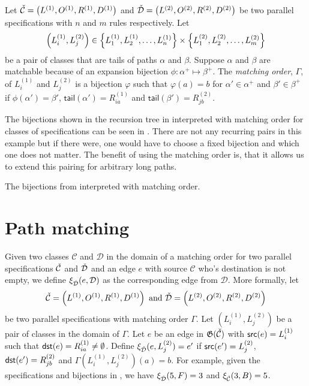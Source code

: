 \begin{definition}
Let $\check{\mathcal{C}} = \left(L^{(1)}, O^{(1)}, R^{(1)}, D^{(1)}\right)$ and $\check{\mathcal{D}} = \left(L^{(2)}, O^{(2)}, R^{(2)}, D^{(2)}\right)$ be two parallel specifications with $n$ and $m$ rules respectively. Let
\[
    \left(L^{(1)}_i,L^{(2)}_j\right) \in \left\{L^{(1)}_1,L^{(1)}_2,\dotsc,L^{(1)}_n\right\} \times \left\{L^{(2)}_1, L^{(2)}_2, \dotsc, L^{(2)}_m\right\}
\]
be a pair of classes that are tails of paths $\alpha$ and $\beta$. Suppose $\alpha$ and $\beta$ are matchable because of an expansion bijection $\phi: \alpha^+ \mapsto \beta^+$. The \emph{matching order}, $\Gamma$, of $L^{(1)}_i$ and $L^{(2)}_j$ is a bijection $\varphi$ such that $\varphi(a) = b$ for $\alpha'\in \alpha^+$ and $\beta'\in \beta^+$ if $\phi(\alpha') = \beta'$, $\textsf{tail}(\alpha') = R^{(1)}_{ia}$ and $\textsf{tail}(\beta')=R^{(2)}_{jb}$.
\end{definition}

The bijections shown in the recursion tree in  interpreted with matching order for classes of specifications can be seen in . There are not any recurring pairs in this example but if there were, one would have to choose a fixed bijection and which one does not matter. The benefit of using the matching order is, that it allows us to extend this pairing for arbitrary long paths.

\begin{table}[ht!]
    \centering
    
    \caption{The bijections from  interpreted with matching order.}
    \label{tab:corrmatch}
\end{table}

\section{Path matching}
Given two classes $\mathcal{C}$ and $\mathcal{D}$ in the domain of a matching order for two parallel specifications $\check{\mathcal{C}}$ and $\check{\mathcal{D}}$ and an edge $e$ with source $\mathcal{C}$ who's destination is not empty, we define $\xi_{\check{\mathcal{D}}}(e,\mathcal{D})$ as the corresponding edge from $\mathcal{D}$. More formally, let
\[
    \check{\mathcal{C}} = \left(L^{(1)}, O^{(1)}, R^{(1)}, D^{(1)}\right) \text{ and } \check{\mathcal{D}} = \left(L^{(2)}, O^{(2)}, R^{(2)}, D^{(2)}\right)
\]
be two parallel specifications with matching order $\Gamma$. Let $(L_i^{(1)}, L_j^{(2)})$ be a pair of classes in the domain of $\Gamma$. Let $e$ be an edge in $\mathfrak{G}(\check{\mathcal{C}})$ with $\textsf{src}(e) = L_i^{(1)}$ such that $\textsf{dst}(e) = R^{(1)}_{ia}\neq\emptyset$. Define $\xi_{\check{\mathcal{D}}}(e,L_j^{(2)}) = e'$ if $\textsf{src}(e') = L_j^{(2)}$, $\textsf{dst}(e') = R^{(2)}_{jb}$ and $\Gamma(L_i^{(1)}, L_j^{(2)})(a) = b$. For example, given the specifications and bijections in , we have $\xi_{\check{\mathcal{D}}}(5,F) = 3$ and $\xi_{\check{\mathcal{C}}}(3,B) = 5$.

